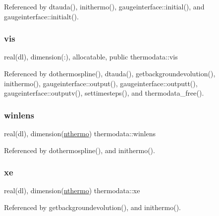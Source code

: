 Referenced by dtauda(), inithermo(), gaugeinterface\+::initial(), and gaugeinterface\+::initialt().

\mbox{\label{namespacethermodata_a14ddce36570d0e50813dc92cd05b57bf}} 
\subsubsection{\texorpdfstring{vis}{vis}}
{\footnotesize\ttfamily real(dl), dimension(\+:), allocatable, public thermodata\+::vis}



Referenced by dothermospline(), dtauda(), getbackgroundevolution(), inithermo(), gaugeinterface\+::output(), gaugeinterface\+::outputt(), gaugeinterface\+::outputv(), settimesteps(), and thermodata\+\_\+free().

\mbox{\label{namespacethermodata_af11b78439f1e2243328bb5c4b111af76}} 
\subsubsection{\texorpdfstring{winlens}{winlens}}
{\footnotesize\ttfamily real(dl), dimension(\mbox{\hyperlink{namespacethermodata_ab5a6325bede2b0cce4e867e9e1e18215}{nthermo}}) thermodata\+::winlens\hspace{0.3cm}{\ttfamily [private]}}



Referenced by dothermospline(), and inithermo().

\mbox{\label{namespacethermodata_a253c9b40af269388f742a8651d063c18}} 
\subsubsection{\texorpdfstring{xe}{xe}}
{\footnotesize\ttfamily real(dl), dimension(\mbox{\hyperlink{namespacethermodata_ab5a6325bede2b0cce4e867e9e1e18215}{nthermo}}) thermodata\+::xe\hspace{0.3cm}{\ttfamily [private]}}



Referenced by getbackgroundevolution(), and inithermo().

